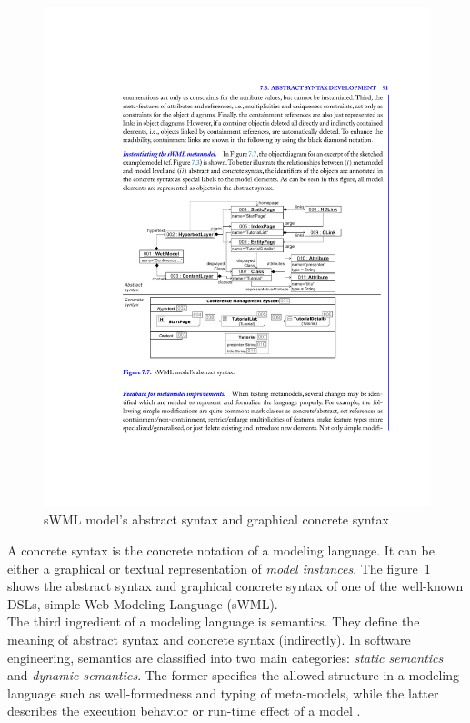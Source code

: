 \begin{figure}[H]
\centering
\captionsetup{justification=centering}
\vspace{0cm}%
\includegraphics[width=0.75\linewidth]{figure/literatures/brambilla_abstract_concrete.pdf}
\caption{sWML model's abstract syntax and graphical concrete syntax \cite{Brambilla}}
\label{fig:brambilla-abstract-concrete}
\end{figure}

A concrete syntax is the concrete notation of a modeling language. It can be either a graphical or textual representation of \textit{model instances}. The figure~\ref{fig:brambilla-abstract-concrete} shows the abstract syntax and graphical concrete syntax of one of the well-known DSLs, simple Web Modeling Language (sWML). \\

The third ingredient of a modeling language is semantics. They define the meaning of abstract syntax and concrete syntax (indirectly). In software engineering, semantics are classified into two main categories: \textit{static semantics} and \textit{dynamic semantics}. The former specifies the allowed structure in a modeling language such as well-formedness and typing of meta-models, while the latter describes the execution behavior or run-time
effect of a model \cite{Stuurman}.


